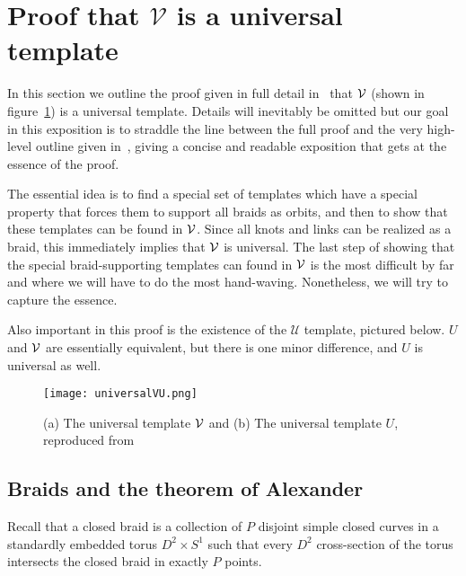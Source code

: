 \documentclass[paper.tex]{subfiles}
\begin{document}
\section{Proof that $\mathcal{V}$ is a universal template}

In this section we outline the proof given in full detail in~\cite{Ghrist1996} that $\mathcal{V}$ (shown in figure~\ref{fig:universal}) is a universal template. Details will inevitably be omitted but our goal in this exposition is to straddle the line between
the full proof and the very high-level outline given in~\cite{knottyode}, giving a concise and readable exposition that gets at the essence of the proof.

The essential idea is to find a special set of templates which have a special property that forces them to support all braids as orbits, and then to show that these templates can be found in $\mathcal{V}$. Since all knots and links
can be realized as a braid, this immediately implies that $\mathcal{V}$ is universal. The last step of showing that the special braid-supporting templates can found in $\mathcal{V}$ is the most difficult by far and where we will have to do the
most hand-waving. Nonetheless, we will try to capture the essence.

Also important in this proof is the existence of the $\mathcal{U}$ template, pictured below. $U$ and $\mathcal{V}$ are essentially equivalent, but there is one minor difference, and $U$ is universal as well.

\begin{figure}[h]

  \centering
  \texttt{[image: universalVU.png]}
  \caption{(a) The universal template $\mathcal{V}$ and (b) The universal template $U$, reproduced from~\cite{ghs1997}}\label{fig:universal}
\end{figure}


\subsection{Braids and the theorem of Alexander}

Recall that a closed braid is a collection of $P$ disjoint simple closed curves in a standardly embedded torus $D^2 \times S^1$ such that every $D^2$ cross-section of the torus intersects the closed braid in exactly $P$ points.
\end{document}
